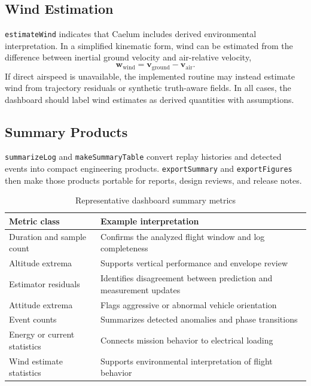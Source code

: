 \documentclass[colorlinks,upint,subscriptcorrection,varvw,hyphenate,balance]{asmeconf}
\newcommand{\code}[1]{\texttt{\allowbreak#1}}
\newcommand{\vvec}{\mathbf{v}}
\begin{document}
\subsection{Wind Estimation}
\code{estimateWind} indicates that Caelum includes derived environmental interpretation. In a simplified kinematic form, wind can be estimated from the difference between inertial ground velocity and air-relative velocity,
\begin{equation}
\mathbf{w}_{\mathrm{wind}} =
\vvec_{\mathrm{ground}} - \vvec_{\mathrm{air}}.
\label{eq:wind}
\end{equation}
If direct airspeed is unavailable, the implemented routine may instead estimate wind from trajectory residuals or synthetic truth-aware fields. In all cases, the dashboard should label wind estimates as derived quantities with assumptions.

\subsection{Summary Products}
\code{summarizeLog} and \code{makeSummaryTable} convert replay histories and detected events into compact engineering products. \code{exportSummary} and \code{exportFigures} then make those products portable for reports, design reviews, and release notes.

\begin{table}[t]
\caption{Representative dashboard summary metrics}
\centering
\begin{tabularx}{\columnwidth}{l Y}
\toprule
Metric class & Example interpretation \\
\midrule
Duration and sample count & Confirms the analyzed flight window and log completeness \\
Altitude extrema & Supports vertical performance and envelope review \\
Estimator residuals & Identifies disagreement between prediction and measurement updates \\
Attitude extrema & Flags aggressive or abnormal vehicle orientation \\
Event counts & Summarizes detected anomalies and phase transitions \\
Energy or current statistics & Connects mission behavior to electrical loading \\
Wind estimate statistics & Supports environmental interpretation of flight behavior \\
\bottomrule
\end{tabularx}
\label{tab:summary_metrics}
\end{table}
\end{document}
